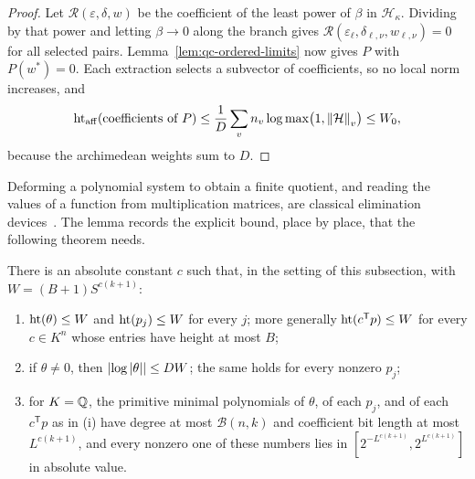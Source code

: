 \begin{proof}
Let $\mathcal R(\varepsilon,\delta,w)$ be the coefficient of the least power
of $\beta$ in $\mathcal H_\kappa$. Dividing by that power and letting
$\beta\to0$ along the branch gives
$\mathcal R(\varepsilon_\ell,\delta_{\ell,\nu},w_{\ell,\nu})=0$ for all
selected pairs. Lemma~\ref{lem:qc-ordered-limits} now gives $P$ with
$P(w^*)=0$. Each extraction selects a subvector of coefficients, so no local
norm increases, and
\[
\operatorname{ht}_{\rm aff}(\text{coefficients of }P)\le
\frac1D\sum_vn_v\log\max\bigl(1,\left\lVert\mathcal H\right\rVert_v\bigr)\le W_0,
\]
because the archimedean weights sum to $D$.
\end{proof}

Deforming a polynomial system to obtain a finite quotient, and reading the
values of a function from multiplication matrices, are classical elimination
devices~\cite{Canny1990,GrigorievPasechnik2005}. The lemma records the
explicit bound, place by place, that the following theorem needs.

\begin{theorem}
\label{thm:qc-height}
There is an absolute constant $c$ such that, in the setting of this
subsection, with $W=(B+1)S^{c(k+1)}$:
\begin{enumerate}[label=(\roman*),leftmargin=*]
\item $\operatorname{ht}(\theta)\le W$ and $\operatorname{ht}(p_j)\le W$ for every $j$; more
generally $\operatorname{ht}(c^{\mathsf T}p)\le W$ for every $c\in K^n$ whose entries
have height at most $B$;
\item if $\theta\ne0$, then $\left\lvert\log\left\lvert\theta\right\rvert\right\rvert\le DW$; the same holds for
every nonzero $p_j$;
\item for $K=\mathbb Q$, the primitive minimal polynomials of $\theta$, of each
$p_j$, and of each $c^{\mathsf T}p$ as in (i) have degree at most
$\mathcal B(n,k)$ and coefficient bit length at most $L^{c(k+1)}$, and every
nonzero one of these numbers lies in
$[2^{-L^{c(k+1)}},2^{L^{c(k+1)}}]$ in absolute value.
\end{enumerate}
\end{theorem}


